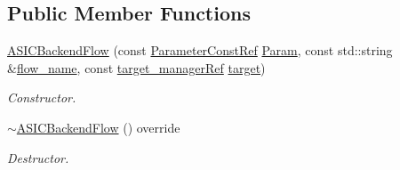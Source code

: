 \subsection*{Public Member Functions}
\begin{DoxyCompactItemize}
\item 
\hyperlink{classASICBackendFlow_ac2e7ed2ec6418916f904d43fb2c9dcd0}{A\+S\+I\+C\+Backend\+Flow} (const \hyperlink{Parameter_8hpp_a37841774a6fcb479b597fdf8955eb4ea}{Parameter\+Const\+Ref} \hyperlink{classBackendFlow_a7d21e7cf0afc64b13e0009c9e351873d}{Param}, const std\+::string \&\hyperlink{classBackendFlow_acb230ccab7e32cf0a88811097ff8c3f8}{flow\+\_\+name}, const \hyperlink{target__manager_8hpp_aee0b586a84fb6eb4faefa6e41e1735a9}{target\+\_\+manager\+Ref} \hyperlink{classBackendFlow_a693ab6eaf29b1836eb91dcd92eb0189f}{target})
\begin{DoxyCompactList}\small\item\em Constructor. \end{DoxyCompactList}\item 
\hyperlink{classASICBackendFlow_abc8ca0ae73028f5617092d16f147f1e8}{$\sim$\+A\+S\+I\+C\+Backend\+Flow} () override
\begin{DoxyCompactList}\small\item\em Destructor. \end{DoxyCompactList}\end{DoxyCompactItemize}
